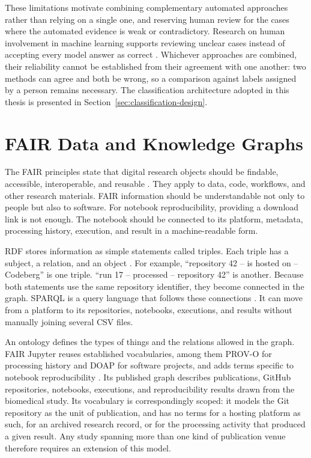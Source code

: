 These limitations motivate combining complementary automated approaches rather than relying on a single one, and reserving human review for the cases where the automated evidence is weak or contradictory. Research on human involvement in machine learning supports reviewing unclear cases instead of accepting every model answer as correct \cite{mosqueira2023hitl}. Whichever approaches are combined, their reliability cannot be established from their agreement with one another: two methods can agree and both be wrong, so a comparison against labels assigned by a person remains necessary. The classification architecture adopted in this thesis is presented in Section~\ref{sec:classification-design}.

\clearpage
\section{FAIR Data and Knowledge Graphs}

The FAIR principles state that digital research objects should be findable, accessible, interoperable, and reusable \cite{wilkinson2016fair}. They apply to data, code, workflows, and other research materials. FAIR information should be understandable not only to people but also to software. For notebook reproducibility, providing a download link is not enough. The notebook should be connected to its platform, metadata, processing history, execution, and result in a machine-readable form.

RDF stores information as simple statements called triples. Each triple has a subject, a relation, and an object \cite{rdf2014}. For example, ``repository 42 -- is hosted on -- Codeberg'' is one triple. ``run 17 -- processed -- repository 42'' is another. Because both statements use the same repository identifier, they become connected in the graph. SPARQL is a query language that follows these connections \cite{sparql2013}. It can move from a platform to its repositories, notebooks, executions, and results without manually joining several CSV files.

An ontology defines the types of things and the relations allowed in the graph. FAIR Jupyter reuses established vocabularies, among them PROV-O for processing history and DOAP for software projects, and adds terms specific to notebook reproducibility \cite{samuel2024fairjupyter}. Its published graph describes publications, GitHub repositories, notebooks, executions, and reproducibility results drawn from the biomedical study. Its vocabulary is correspondingly scoped: it models the Git repository as the unit of publication, and has no terms for a hosting platform as such, for an archived research record, or for the processing activity that produced a given result. Any study spanning more than one kind of publication venue therefore requires an extension of this model.

